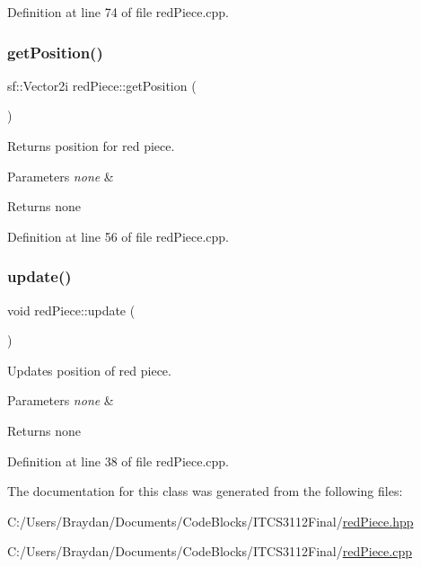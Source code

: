 Definition at line 74 of file red\+Piece.\+cpp.

\mbox{\label{classred_piece_a1a707e1a60df9654c3158f97eaf0a22b}} 
\subsubsection{\texorpdfstring{getPosition()}{getPosition()}}
{\footnotesize\ttfamily sf\+::\+Vector2i red\+Piece\+::get\+Position (\begin{DoxyParamCaption}{ }\end{DoxyParamCaption})}

Returns position for red piece.


\begin{DoxyParams}{Parameters}
{\em none} & \\
\hline
\end{DoxyParams}
\begin{DoxyReturn}{Returns}
none 
\end{DoxyReturn}


Definition at line 56 of file red\+Piece.\+cpp.

\mbox{\label{classred_piece_a90dbfbe8e12b0495e9ff01819b89b5d2}} 
\subsubsection{\texorpdfstring{update()}{update()}}
{\footnotesize\ttfamily void red\+Piece\+::update (\begin{DoxyParamCaption}{ }\end{DoxyParamCaption})}

Updates position of red piece.


\begin{DoxyParams}{Parameters}
{\em none} & \\
\hline
\end{DoxyParams}
\begin{DoxyReturn}{Returns}
none 
\end{DoxyReturn}


Definition at line 38 of file red\+Piece.\+cpp.



The documentation for this class was generated from the following files\+:\begin{DoxyCompactItemize}
\item 
C\+:/\+Users/\+Braydan/\+Documents/\+Code\+Blocks/\+I\+T\+C\+S3112\+Final/\mbox{\hyperlink{red_piece_8hpp}{red\+Piece.\+hpp}}\item 
C\+:/\+Users/\+Braydan/\+Documents/\+Code\+Blocks/\+I\+T\+C\+S3112\+Final/\mbox{\hyperlink{red_piece_8cpp}{red\+Piece.\+cpp}}\end{DoxyCompactItemize}

